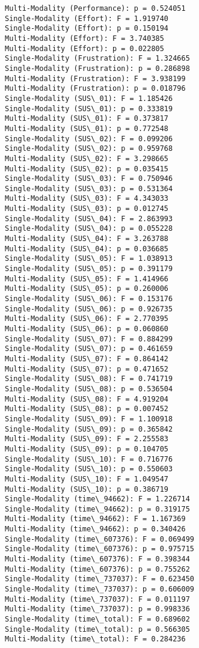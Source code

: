 \documentclass[11pt]{article}
\begin{document}
\begin{Verbatim}[commandchars=\\\{\}]
Multi-Modality (Performance): p = 0.524051
Single-Modality (Effort): F = 1.919740
Single-Modality (Effort): p = 0.150194
Multi-Modality (Effort): F = 3.740385
Multi-Modality (Effort): p = 0.022805
Single-Modality (Frustration): F = 1.324665
Single-Modality (Frustration): p = 0.286898
Multi-Modality (Frustration): F = 3.938199
Multi-Modality (Frustration): p = 0.018796
Single-Modality (SUS\_01): F = 1.185426
Single-Modality (SUS\_01): p = 0.333819
Multi-Modality (SUS\_01): F = 0.373817
Multi-Modality (SUS\_01): p = 0.772548
Single-Modality (SUS\_02): F = 0.099206
Single-Modality (SUS\_02): p = 0.959768
Multi-Modality (SUS\_02): F = 3.298665
Multi-Modality (SUS\_02): p = 0.035415
Single-Modality (SUS\_03): F = 0.750946
Single-Modality (SUS\_03): p = 0.531364
Multi-Modality (SUS\_03): F = 4.343033
Multi-Modality (SUS\_03): p = 0.012745
Single-Modality (SUS\_04): F = 2.863993
Single-Modality (SUS\_04): p = 0.055228
Multi-Modality (SUS\_04): F = 3.263788
Multi-Modality (SUS\_04): p = 0.036685
Single-Modality (SUS\_05): F = 1.038913
Single-Modality (SUS\_05): p = 0.391179
Multi-Modality (SUS\_05): F = 1.414966
Multi-Modality (SUS\_05): p = 0.260006
Single-Modality (SUS\_06): F = 0.153176
Single-Modality (SUS\_06): p = 0.926735
Multi-Modality (SUS\_06): F = 2.770395
Multi-Modality (SUS\_06): p = 0.060860
Single-Modality (SUS\_07): F = 0.884299
Single-Modality (SUS\_07): p = 0.461659
Multi-Modality (SUS\_07): F = 0.864142
Multi-Modality (SUS\_07): p = 0.471652
Single-Modality (SUS\_08): F = 0.741719
Single-Modality (SUS\_08): p = 0.536504
Multi-Modality (SUS\_08): F = 4.919204
Multi-Modality (SUS\_08): p = 0.007452
Single-Modality (SUS\_09): F = 1.100918
Single-Modality (SUS\_09): p = 0.365842
Multi-Modality (SUS\_09): F = 2.255583
Multi-Modality (SUS\_09): p = 0.104705
Single-Modality (SUS\_10): F = 0.716776
Single-Modality (SUS\_10): p = 0.550603
Multi-Modality (SUS\_10): F = 1.049547
Multi-Modality (SUS\_10): p = 0.386719
Single-Modality (time\_94662): F = 1.226714
Single-Modality (time\_94662): p = 0.319175
Multi-Modality (time\_94662): F = 1.167369
Multi-Modality (time\_94662): p = 0.340426
Single-Modality (time\_607376): F = 0.069499
Single-Modality (time\_607376): p = 0.975715
Multi-Modality (time\_607376): F = 0.398344
Multi-Modality (time\_607376): p = 0.755262
Single-Modality (time\_737037): F = 0.623450
Single-Modality (time\_737037): p = 0.606009
Multi-Modality (time\_737037): F = 0.011197
Multi-Modality (time\_737037): p = 0.998336
Single-Modality (time\_total): F = 0.689602
Single-Modality (time\_total): p = 0.566305
Multi-Modality (time\_total): F = 0.284236

\end{Verbatim}
\end{document}
